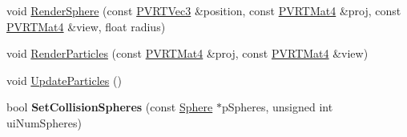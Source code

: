 \begin{DoxyCompactItemize}
\item 
void \hyperlink{class_o_g_l_e_s3_particle_system_a02c9d32cde843e2337f7a8a09203a851}{Render\+Sphere} (const \hyperlink{struct_p_v_r_t_vec3}{P\+V\+R\+T\+Vec3} \&position, const \hyperlink{struct_p_v_r_t_mat4}{P\+V\+R\+T\+Mat4} \&proj, const \hyperlink{struct_p_v_r_t_mat4}{P\+V\+R\+T\+Mat4} \&view, float radius)
\item 
void \hyperlink{class_o_g_l_e_s3_particle_system_a5c51633f40c3c7ec7173f7fc2bb10e26}{Render\+Particles} (const \hyperlink{struct_p_v_r_t_mat4}{P\+V\+R\+T\+Mat4} \&proj, const \hyperlink{struct_p_v_r_t_mat4}{P\+V\+R\+T\+Mat4} \&view)
\item 
void \hyperlink{class_o_g_l_e_s3_particle_system_a6a5298b337191501c6de7378242c0bc4}{Update\+Particles} ()
\item 
\hypertarget{class_o_g_l_e_s3_particle_system_ab523a2689f20c6aac5f7e1b1521838f8}{bool {\bfseries Set\+Collision\+Spheres} (const \hyperlink{class_sphere}{Sphere} $\ast$p\+Spheres, unsigned int ui\+Num\+Spheres)}\label{class_o_g_l_e_s3_particle_system_ab523a2689f20c6aac5f7e1b1521838f8}

\end{DoxyCompactItemize}
